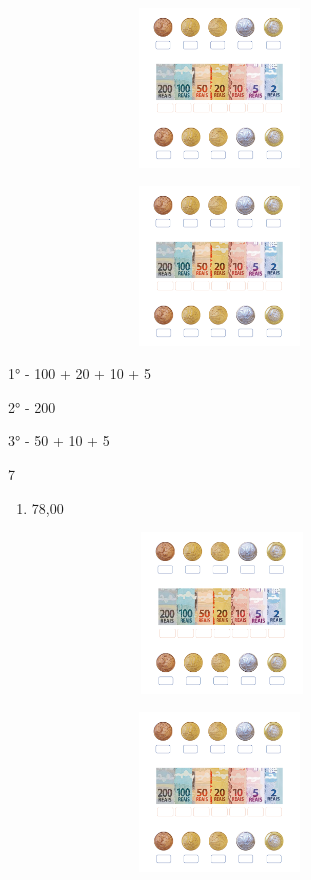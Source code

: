 {{{{{{{{{\includegraphics[width=4.40625in,height=1.66152in]{media/image72.png}

\includegraphics[width=4.40625in,height=1.66152in]{media/image72.png}

1° - 100 + 20 + 10 + 5

2° - 200

3° - 50 + 10 + 5

\num{7}

\begin{enumerate}
\def\labelenumi{\alph{enumi})}
\item
  78,00
\end{enumerate}

\includegraphics[width=4.45833in,height=1.68116in]{media/image72.png}

\includegraphics[width=4.40625in,height=1.66152in]{media/image72.png}

}}}}}}}}}
